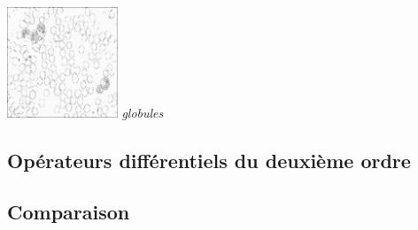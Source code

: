 \documentclass[a4,12pt]{article}
\begin{document}
\begin{minipage}[c]{0.20\linewidth}
	\begin{center}
		\includegraphics[width = 33mm]{./img/p2test_grad_fin_globules_t10.jpg}
		\textit{globules}
	\end{center}
\end{minipage}


\subsection{Opérateurs différentiels du deuxième ordre}

\subsection{Comparaison}


\end{document}
